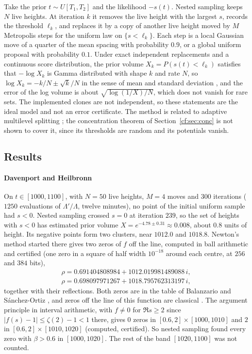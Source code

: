 Take the prior $t\sim U[T_1,T_2]$ and the likelihood $-s(t)$. Nested sampling keeps $N$ live heights. At iteration $k$ it removes the live height with the largest $s$, records the threshold $\ell_k$, and replaces it by a copy of another live height moved by $M$ Metropolis steps for the uniform law on $\{s<\ell_k\}$. Each step is a local Gaussian move of a quarter of the mean spacing with probability $0.9$, or a global uniform proposal with probability $0.1$. Under exact independent replacements and a continuous score distribution, the prior volume $X_k=P(s(t)<\ell_k)$ satisfies that $-\log X_k$ is Gamma distributed with shape $k$ and rate $N$, so $\log X_k=-k/N\pm\sqrt k/N$ in the sense of mean and standard deviation \cite{Skilling06,ChopinRobert10}, and the error of the log volume is about $\sqrt{\log(1/X)/N}$, which does not vanish for rare sets. The implemented clones are not independent, so these statements are the ideal model and not an error certificate. The method is related to adaptive multilevel splitting \cite{CDFG12}; the concentration theorem of Section~\ref{cf:sec:conc} is not shown to cover it, since its thresholds are random and its potentials vanish.

\subsection{Results}

\paragraph{Davenport and Heilbronn} \begin{resultpar}\label{cf:res:nsdh}On $t\in[1000,1100]$, with $N=50$ live heights, $M=4$ moves and $300$ iterations ($1250$ evaluations of $\Lambda'/\Lambda$, twelve minutes), no point of the initial uniform sample had $s<0$. Nested sampling crossed $s=0$ at iteration $239$, so the set of heights with $s<0$ has estimated prior volume $X=e^{-4.78\pm0.31}\approx0.008$, about $0.8$ units of height. Its negative points form two clusters, near $1012.0$ and $1018.8$. Newton's method started there gives two zeros of $f$ off the line, computed in ball arithmetic and certified (one zero in a square of half width $10^{-18}$ around each centre, at $256$ and $384$ bits),
\[
\begin{gathered}
\rho=0.691404808984+1012.019981489088\,i,\\
\rho=0.698097971267+1018.795762313197\,i,
\end{gathered}
\]
together with their reflections. Both zeros are in the table of Balanzario and S\'anchez-Ortiz \cite{BSO07}, and zeros off the line of this function are classical \cite{DH36,Spira94,BSO07}. The argument principle in interval arithmetic, with $f\ne0$ for $\Re s\ge2$ since $\lvert f(s)-1\rvert\le\zeta(2)-1<1$ there, gives $0$ zeros in $[0.6,2]\times[1000,1010]$ and $2$ in $[0.6,2]\times[1010,1020]$ (computed, certified). So nested sampling found every zero with $\beta>0.6$ in $[1000,1020]$. The rest of the band $[1020,1100]$ was not counted.\end{resultpar}

